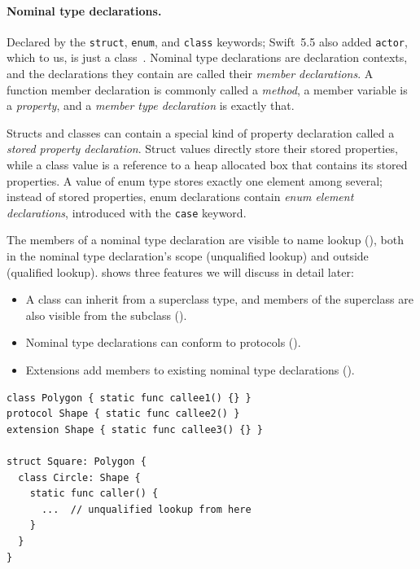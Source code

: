 \documentclass[../generics]{subfiles}
\begin{document}
\paragraph{Nominal type declarations.}
Declared by the \texttt{struct}, \texttt{enum}, and \texttt{class} keywords; Swift~5.5 also added \texttt{actor}, which to us, is just a class~\cite{se0306}. Nominal type declarations are declaration contexts, and the declarations they contain are called their \emph{member declarations}. A function member declaration is commonly called a \emph{method}, a member variable is a \emph{property}, and a \emph{member type declaration} is exactly that.

Structs and classes can contain a special kind of property declaration called a \emph{stored property declaration}. Struct values directly store their stored properties, while a class value is a reference to a heap allocated box that contains its stored properties. A value of enum type stores exactly one element among several; instead of stored properties, enum declarations contain \emph{enum element declarations}, introduced with the \texttt{case} keyword.

The members of a nominal type declaration are visible to name lookup (), both in the nominal type declaration's scope (unqualified lookup) and outside (qualified lookup).  shows three features we will discuss in detail later:
\begin{itemize}
\item A class can inherit from a superclass type, and members of the superclass are also visible from the subclass ().
\item Nominal type declarations can conform to protocols ().
\item Extensions add members to existing nominal type declarations ().
\end{itemize}

\begin{listing}\label{unqualified lookup listing}
\begin{Verbatim}
class Polygon { static func callee1() {} }
protocol Shape { static func callee2() }
extension Shape { static func callee3() {} }

struct Square: Polygon {
  class Circle: Shape {
    static func caller() {
      ...  // unqualified lookup from here
    }
  }
}
\end{Verbatim}
\end{listing}
\end{document}
